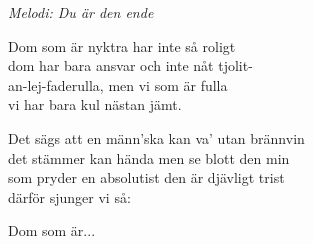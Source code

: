 {\footnotesize\textit{Melodi: Du är den ende}}\par
\vspace{10pt}
Dom som är nyktra har inte så roligt\\
dom har bara ansvar och inte nåt tjolit-\\
an-lej-faderulla, men vi som är fulla\\
vi har bara kul nästan jämt.\par
\vspace{10pt}
Det sägs att en männ'ska kan va' utan brännvin\\
det stämmer kan hända men se blott den min\\
som pryder en absolutist den är djävligt trist\\
därför sjunger vi så:\par
\vspace{10pt}
Dom som är...
